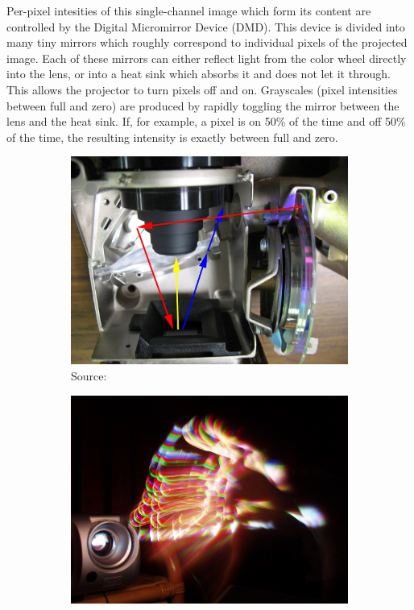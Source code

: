 Per-pixel intesities of this single-channel image which form its content are controlled by the Digital Micromirror Device (DMD). This device is divided into many tiny mirrors which roughly correspond to individual pixels of the projected image. Each of these mirrors can either reflect light from the color wheel directly into the lens, or into a heat sink which absorbs it and does not let it through. This allows the projector to turn pixels off and on. Grayscales (pixel intensities between full and zero) are produced by rapidly toggling the mirror between the lens and the heat sink. If, for example, a pixel is on 50\% of the time and off 50\% of the time, the resulting intensity is exactly between full and zero.

\begin{figure}[ht]
    \centering
    \begin{subfigure}[b]{0.49\textwidth}
        \centering
        \includegraphics[width=\textwidth]{images/02-projector_dlp.jpg}
        \caption{Source: \citet{ImageProjectorDLP}}
    \end{subfigure}
    \hfill
    \begin{subfigure}[b]{0.49\textwidth}
        \centering
        \includegraphics[width=\textwidth]{images/02-projector_rainbow.JPG}

\end{subfigure}
\end{figure}
